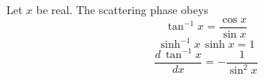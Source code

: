 \documentclass{article}
\begin{document}
Let $x$ be real. The scattering phase obeys
\begin{equation}
\tan^{-1} x = \frac{\cos x}{\sin x}
\label{eq:v1}
\end{equation}
\begin{equation}
\sinh^{-1} x \, \sinh x = 1
\label{eq:v2}
\end{equation}
\begin{equation}
\frac{d\,\tan^{-1} x}{dx} = -\frac{1}{\sin^2 x}
\label{eq:v3}
\end{equation}
\end{document}
